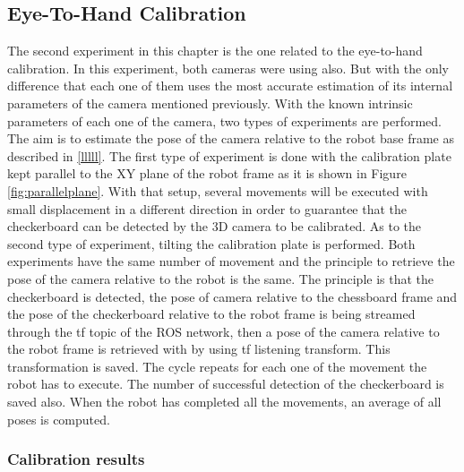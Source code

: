 \subsection{Eye-To-Hand Calibration}
The second experiment in this chapter is the one related to the eye-to-hand calibration. In this experiment, both cameras were using also. But with the only difference that each one of them uses the most accurate estimation of its internal parameters of the camera mentioned previously. With the known intrinsic parameters of each one of the camera, two types of experiments are performed.\\
The aim is to estimate the pose of the camera relative to the robot base frame as described in \ref{lllll}. The first type of experiment is done with the calibration plate kept parallel to the XY plane of the robot frame as it is shown in Figure \ref{fig:parallelplane}. With that setup, several movements will be executed with small displacement in a different direction in order to guarantee that the checkerboard can be detected by the 3D camera to be calibrated. 
As to the second type of experiment, tilting the calibration plate is performed. 
Both experiments have the same number of movement and the principle to retrieve the pose of the camera relative to the robot is the same. The principle is that the checkerboard is detected, the pose of camera relative to the chessboard frame and the pose of the checkerboard relative to the robot frame is being streamed through the tf topic of  the ROS network, then a pose of the camera relative to the robot frame is retrieved with by using tf listening transform. This transformation is saved. The cycle repeats for each one of the movement the robot has to execute. The number of successful detection of the checkerboard is saved also. When the robot has completed all the movements, an average of all poses is computed. 


\subsubsection{Calibration results}


